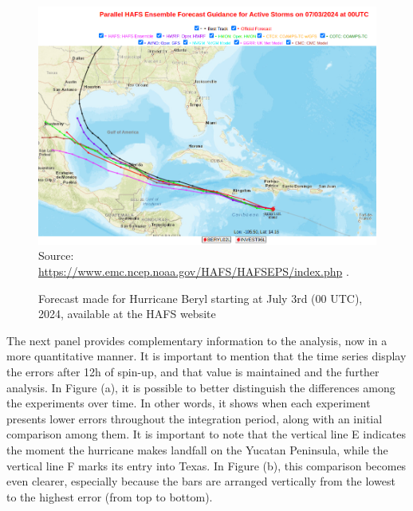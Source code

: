 \begin{figure}[!ht]
	\centering
	\caption{Forecast made for Hurricane Beryl starting at July 3rd (00 UTC), 2024, available at the HAFS website} %
	\includegraphics[width=\textwidth]{docs/figuras/chapter5/HAFS_trajectory.png} 
	\vspace{0.5em}
	Source: \url{https://www.emc.ncep.noaa.gov/HAFS/HAFSEPS/index.php} . %
	\label{fig:berryl3rd} %
\end{figure}

The next panel provides complementary information to the analysis, now in a more quantitative manner. It is important to mention that the time series display the errors after 12h of spin-up, and that value is maintained and the further analysis. In Figure (a), it is possible to better distinguish the differences among the experiments over time. In other words, it shows when each experiment presents lower errors throughout the integration period, along with an initial comparison among them. It is important to note that the vertical line E indicates the moment the hurricane makes landfall on the Yucatan Peninsula, while the vertical line F marks its entry into Texas. In Figure (b), this comparison becomes even clearer, especially because the bars are arranged vertically from the lowest to the highest error (from top to bottom).

